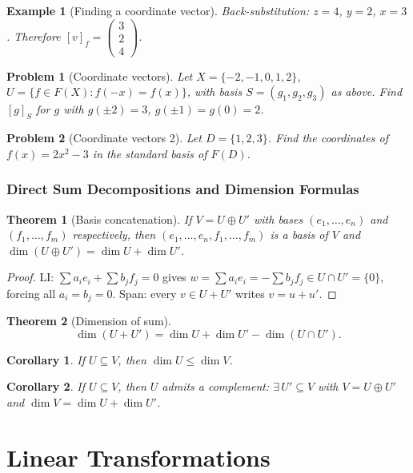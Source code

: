 \documentclass{article}
\newtheorem{theorem}{Theorem}
\newtheorem{corollary}{Corollary}[theorem]
\newtheorem{problem}{Problem}
\newtheorem*{example}{Example}
\begin{document}
\begin{example}[Finding a coordinate vector]
    Back-substitution: $z=4$, $y=2$, $x=3$. Therefore $[v]_f=\begin{pmatrix}3\\2\\4\end{pmatrix}$.
\end{example}
\begin{problem}[Coordinate vectors]
    Let $X=\{-2,-1,0,1,2\}$, $U=\{f\in F(X):f(-x)=f(x)\}$, with basis $S=(g_1,g_2,g_3)$ as above. Find $[g]_S$ for $g$ with $g(\pm2)=3$, $g(\pm1)=g(0)=2$.
\end{problem}
\begin{problem}[Coordinate vectors 2]
    Let $D=\{1,2,3\}$. Find the coordinates of $f(x)=2x^2-3$ in the standard basis of $F(D)$.
\end{problem}

\subsubsection{Direct Sum Decompositions and Dimension Formulas}
\begin{theorem}[Basis concatenation]
    If $V = U\oplus U'$ with bases $(e_1,\ldots,e_n)$ and $(f_1,\ldots,f_m)$ respectively, then $(e_1,\ldots,e_n,f_1,\ldots,f_m)$ is a basis of $V$ and $\dim(U\oplus U') = \dim U + \dim U'$.
\end{theorem}
\begin{proof}
    LI: $\sum a_ie_i + \sum b_jf_j = 0$ gives $w = \sum a_ie_i = -\sum b_jf_j \in U\cap U' = \{0\}$, forcing all $a_i=b_j=0$. Span: every $v\in U+U'$ writes $v=u+u'$.
\end{proof}
\begin{theorem}[Dimension of sum]
    \[\dim(U+U') = \dim U + \dim U' - \dim(U\cap U').\]
\end{theorem}
\begin{corollary}
    If $U\subseteq V$, then $\dim U \le \dim V$.
\end{corollary}
\begin{corollary}
    If $U\subseteq V$, then $U$ admits a complement: $\exists\, U'\subseteq V$ with $V = U\oplus U'$ and $\dim V = \dim U + \dim U'$.
\end{corollary}

\section{Linear Transformations}
\end{document}
